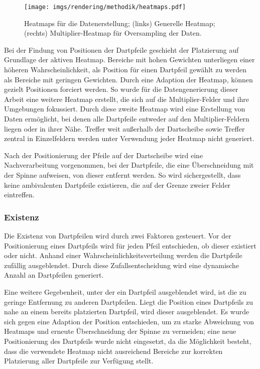 \begin{figure}
    \centering
    \texttt{[image: imgs/rendering/methodik/heatmaps.pdf]}
    \caption{Heatmaps für die Datenerstellung; (links) Generelle Heatmap; (rechts) Multiplier-Heatmap für Oversampling der Daten.}
    \label{img:heatmaps}
\end{figure}

Bei der Findung von Positionen der Dartpfeile geschieht der Platzierung auf Grundlage der aktiven Heatmap. Bereiche mit hohen Gewichten unterliegen einer höheren Wahrscheinlichkeit, als Position für einen Dartpfeil gewählt zu werden als Bereiche mit geringen Gewichten. Durch eine Adaption der Heatmap, können gezielt Positionen forciert werden. So wurde für die Datengenerierung dieser Arbeit eine weitere Heatmap erstellt, die sich auf die Multiplier-Felder und ihre Umgebungen fokussiert. Durch diese zweite Heatmap wird eine Erstellung von Daten ermöglicht, bei denen alle Dartpfeile entweder auf den Multiplier-Feldern liegen oder in ihrer Nähe. Treffer weit außerhalb der Dartscheibe sowie Treffer zentral in Einzelfeldern werden unter Verwendung jeder Heatmap nicht generiert.

Nach der Positionierung der Pfeile auf der Dartscheibe wird eine Nachverarbeitung vorgenommen, bei der Dartpfeile, die eine Überschneidung mit der Spinne aufweisen, von dieser entfernt werden. So wird sichergestellt, dass keine ambivalenten Dartpfeile existieren, die auf der Grenze zweier Felder eintreffen.

\subsubsection{Existenz}

Die Existenz von Dartpfeilen wird durch zwei Faktoren gesteuert. Vor der Positionierung eines Dartpfeils wird für jeden Pfeil entschieden, ob dieser existiert oder nicht. Anhand einer Wahrscheinlichkeitsverteilung werden die Dartpfeile zufällig ausgeblendet. Durch diese Zufallsentscheidung wird eine dynamische Anzahl an Dartpfeilen generiert.

Eine weitere Gegebenheit, unter der ein Dartpfeil ausgeblendet wird, ist die zu geringe Entfernung zu anderen Dartpfeilen. Liegt die Position eines Dartpfeils zu nahe an einem bereits platzierten Dartpfeil, wird dieser ausgeblendet. Es wurde sich gegen eine Adaption der Position entschieden, um zu starke Abweichung von Heatmaps und erneute Überschneidung der Spinne zu vermeiden; eine neue Positionierung des Dartpfeils wurde nicht eingesetzt, da die Möglichkeit besteht, dass die verwendete Heatmap nicht ausreichend Bereiche zur korrekten Platzierung aller Dartpfeile zur Verfügung stellt.

